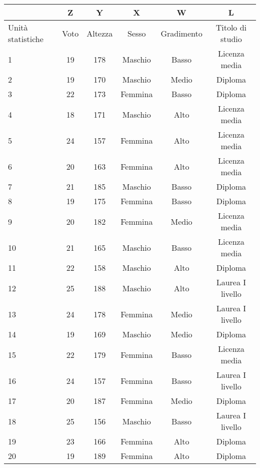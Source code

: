 \begin{center}
\begin{tabular}{|p{1.5cm}|c|c|c|c|c|}
\hline
        &Z&     Y       &X      &W      &L\\
        \hline
Unità statistiche & Voto& Altezza &Sesso& Gradimento& Titolo di studio\\
\hline
         1 & 19 &     178  & Maschio& Basso & Licenza media\\
        \hline
         2 & 19 &     170  & Maschio & Medio & Diploma\\
        \hline
         3 & 22 & 173 & Femmina & Basso & Diploma\\
        \hline
         4 & 18 &    171 & Maschio & Alto & Licenza media\\
        \hline
         5 & 24 &     157 & Femmina & Alto & Licenza media\\
        \hline
         6 & 20 &163 & Femmina & Alto & Licenza media\\
        \hline
         7 & 21 &     185 & Maschio & Basso & Diploma\\
        \hline
         8 & 19 &    175 & Femmina & Basso & Diploma\\
        \hline
         9 &      20&     182 & Femmina & Medio & Licenza media\\
        \hline
        10 &     21      &165 & Maschio & Basso & Licenza media\\
        \hline
        11 &22     &158 & Maschio & Alto & Diploma\\
        \hline
        12 &25     &188 & Maschio & Alto & Laurea I livello\\
        \hline
        13 &24&    178 & Femmina & Medio & Laurea I livello\\
        \hline
        14 &19&    169 & Maschio & Medio & Diploma\\
        \hline
        15 &22&    179 & Femmina & Basso & Licenza media\\
        \hline
        16 &     24      &157 &Femmina & Basso & Laurea I livello\\
        \hline
        17 & 20      &187 & Femmina & Medio & Diploma\\
        \hline
        18 & 25 &    156 & Maschio & Basso & Laurea I livello\\
        \hline
        19 &     23&     166 & Femmina & Alto & Diploma\\
        \hline
        20 &     19      &189 & Femmina & Alto & Diploma\\
        \hline
\end{tabular}
\end{center}

